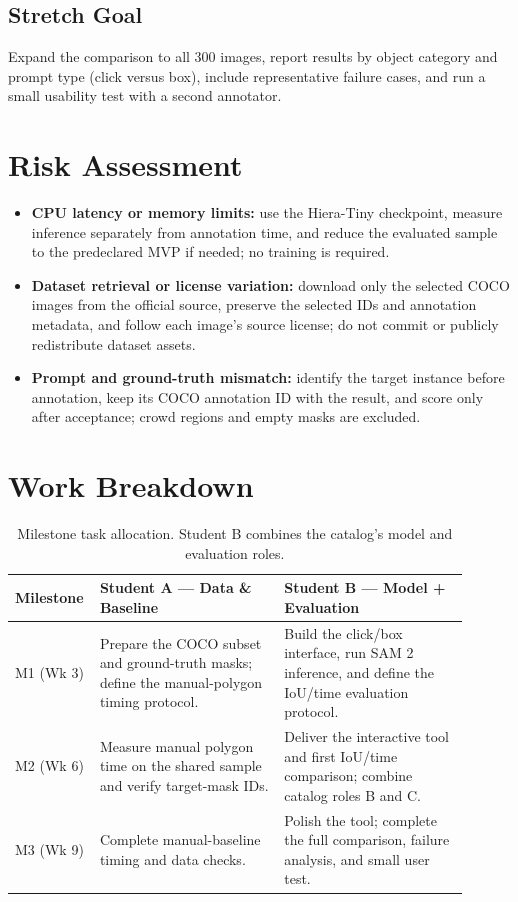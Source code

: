 \documentclass[11pt]{article}
\begin{document}
\subsection{Stretch Goal}
Expand the comparison to all 300 images, report results by object category and
prompt type (click versus box), include representative failure cases, and run a
small usability test with a second annotator.

\section{Risk Assessment}
\label{sec:risk}
\begin{itemize}[leftmargin=*]
  \item \textbf{CPU latency or memory limits:} use the Hiera-Tiny checkpoint,
  measure inference separately from annotation time, and reduce the evaluated
  sample to the predeclared MVP if needed; no training is required.
  \item \textbf{Dataset retrieval or license variation:} download only the
  selected COCO images from the official source, preserve the selected IDs and
  annotation metadata, and follow each image's source license; do not commit or
  publicly redistribute dataset assets.
  \item \textbf{Prompt and ground-truth mismatch:} identify the target instance
  before annotation, keep its COCO annotation ID with the result, and score only
  after acceptance; crowd regions and empty masks are excluded.
\end{itemize}

\section{Work Breakdown}
\label{sec:workbreakdown}
\begin{table}[ht]
\centering
\caption{Milestone task allocation. Student B combines the catalog's model and evaluation roles.}
\label{tab:tasks}
\begin{tabular}{@{}p{0.12\linewidth}p{0.39\linewidth}p{0.39\linewidth}@{}}
\toprule
\textbf{Milestone} & \textbf{Student A --- Data \& Baseline} & \textbf{Student B --- Model + Evaluation} \\
\midrule
M1 (Wk 3) & Prepare the COCO subset and ground-truth masks; define the manual-polygon timing protocol. & Build the click/box interface, run SAM 2 inference, and define the IoU/time evaluation protocol. \\
M2 (Wk 6) & Measure manual polygon time on the shared sample and verify target-mask IDs. & Deliver the interactive tool and first IoU/time comparison; combine catalog roles B and C. \\
M3 (Wk 9) & Complete manual-baseline timing and data checks. & Polish the tool; complete the full comparison, failure analysis, and small user test. \\
\bottomrule
\end{tabular}
\end{table}
\end{document}
